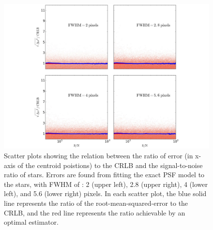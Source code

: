 \begin{figure}[p]~\\
\begin{center}
\includegraphics[width=\linewidth]{figures/centroiding/new_psf.pdf}
\caption{Scatter plots showing the relation between the ratio of error (in x-axis of the centroid poistions) to the CRLB and the signal-to-noise ratio of stars. 
Errors are found from fitting the exact PSF model to the stars,
with FWHM of : 2 (upper left), 2.8 (upper right), 4 (lower left), and 5.6 (lower right)
pixels. In each scatter plot, the blue solid line represents the ratio of the root-mean-squared-error to the CRLB, and the red line represents the ratio achievable by an optimal estimator.}\label{1}
\end{center}
\end{figure}

